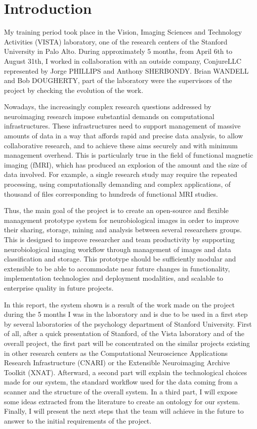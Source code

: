 \section*{Introduction}
\vspace{0.2cm}
\par
My training period took place in the Vision, Imaging Sciences and Technology Activities (VISTA) laboratory, one of the research centers of the Stanford University in Palo Alto. During approximately 5 months, from April 6th  to August 31th, I worked in collaboration with an outside company, ConjureLLC represented by Jorge PHILLIPS and Anthony SHERBONDY. Brian WANDELL and Bob DOUGHERTY, part of the laboratory were the supervisors of the project by checking the evolution of the work.
\par
Nowadays, the increasingly complex research questions addressed by neuroimaging research impose substantial demands on computational infrastructures. These infrastructures need to support management of massive amounts of data in a way that affords rapid and precise data analysis, to allow collaborative research, and to achieve these aims securely and with minimum management overhead. This is particularly true in the field of functional magnetic imaging (fMRI), which has produced an explosion of the amount and the size of data involved. For example, a single research study may require the repeated processing, using computationally demanding and complex applications, of thousand of files corresponding to hundreds of functional MRI studies.
\par
Thus, the main goal of the project is to create an open-source and flexible management prototype system for neurobiological images in order to improve their sharing, storage, mining and analysis between several researchers groups. This is designed to improve researcher and team productivity by supporting neurobiological imaging workflow through management of images and data classification and storage.  This prototype should be sufficiently modular and extensible to be able to accommodate near future changes in functionality, implementation technologies and deployment modalities, and scalable to enterprise quality in future projects.
\par
In this report, the system shown is a result of the work made on the project during the 5 months I was in the laboratory and is due to be used in a first step by several laboratories of the psychology department of Stanford University. First of all, after a quick presentation of Stanford, of the Vista laboratory and of the overall project, the first part will be concentrated on the similar projects existing in other research centers as the Computational Neuroscience Applications Research Infrastructure (CNARI) or the Extensible Neuroimaging Archive Toolkit (XNAT). Afterward, a second part will explain the technological choices made for our system, the standard workflow used for the data coming from a scanner and the structure of the overall system. In a third part, I will expose some ideas extracted from the literature to create an ontology for our system. Finally, I will present the next steps that the team will achieve in the future to answer to the initial requirements of the project.
